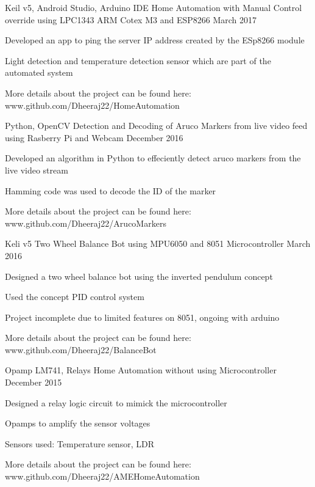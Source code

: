 \begin{cventries}
  \cventry
    {Keil v5, Android Studio, Arduino IDE}
    {Home Automation with Manual Control override using LPC1343 ARM Cotex M3 and ESP8266}
   {}
    {March 2017}
    {
      \begin{cvitems}
        \item {Developed an app to ping the server IP address created by the ESp8266 module}
         \item {Light detection and temperature detection sensor which are part of the automated system}
         \item {More details about the project can be found here: www.github.com/Dheeraj22/HomeAutomation}
      \end{cvitems}
    }
     \cventry
    {Python, OpenCV}
    {Detection and Decoding of Aruco Markers from live video feed using Rasberry Pi and Webcam}
    {}
    {December 2016}
    {
      \begin{cvitems}
        \item {Developed an algorithm in Python to effeciently detect aruco markers from the live video stream}
         \item {Hamming code was used to decode the ID of the marker}
         \item {More details about the project can be found here: www.github.com/Dheeraj22/ArucoMarkers}
      \end{cvitems}
    }
     \cventry
    {Keli v5}
    {Two Wheel Balance Bot using MPU6050 and 8051 Microcontroller}
    {}
    {March 2016}
    {
      \begin{cvitems}
        \item {Designed a two wheel balance bot using the inverted pendulum concept}
         \item {Used the concept PID control system}
         \item {Project incomplete due to limited features on 8051, ongoing with arduino}
         \item {More details about the project can be found here: www.github.com/Dheeraj22/BalanceBot}
      \end{cvitems}
    }
    \cventry
    {Opamp LM741, Relays}
    {Home Automation without using Microcontroller}
    {}
    {December 2015}
    {
      \begin{cvitems}
        \item {Designed a relay logic circuit to mimick the microcontroller}
         \item {Opamps to amplify the sensor voltages}
         \item {Sensors used: Temperature sensor, LDR}
         \item {More details about the project can be found here: www.github.com/Dheeraj22/AMEHomeAutomation}
      \end{cvitems}
    }
\end{cventries}
